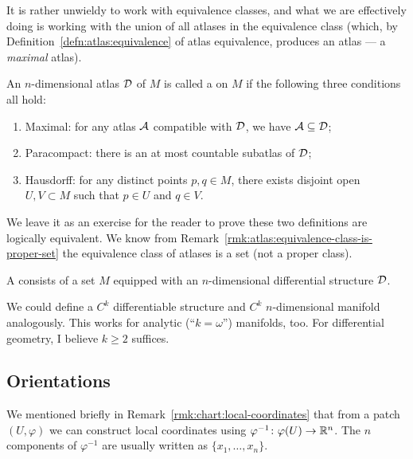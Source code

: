\begin{remark}
It is rather unwieldy to work with equivalence classes, and what we are
effectively doing is working with the union of all atlases in the
equivalence class (which, by Definition~\ref{defn:atlas:equivalence}
of atlas equivalence, produces an atlas --- a \emph{maximal} atlas).
\end{remark}

\begin{definition}
An $n$-dimensional atlas $\mathcal{D}$ of $M$ is called a 
on $M$ if the following three conditions all hold:
\begin{enumerate}
\item Maximal: for any atlas $\mathcal{A}$ compatible with $\mathcal{D}$, we
  have $\mathcal{A}\subseteq\mathcal{D}$;
\item Paracompact: there is an at most countable subatlas of $\mathcal{D}$;
\item Hausdorff: for any distinct points $p,q\in M$, there exists
  disjoint open $U,V\subset M$ such that $p\in U$ and $q\in V$.
\end{enumerate}
\end{definition}

\begin{remark}
We leave it as an exercise for the reader to prove these two definitions
are logically equivalent. We know from Remark~\ref{rmk:atlas:equivalence-class-is-proper-set}
the equivalence class of atlases is a set (not a proper class).
\end{remark}

\begin{definition}
A  consists of
  a set $M$ equipped with an $n$-dimensional differential structure $\mathcal{D}$.
\end{definition}

\begin{remark}
We could define a $C^{k}$ differentiable structure and $C^{k}$
$n$-dimensional manifold analogously. This works for analytic
(``$k=\omega$'') manifolds, too. For differential geometry, I believe
$k\geq2$ suffices.
\end{remark}

\subsection{Orientations}

We mentioned briefly in Remark~\ref{rmk:chart:local-coordinates}
that from a patch $(U,\varphi)$ we can construct local coordinates using
$\varphi^{-1}\colon\varphi(U)\to\mathbb{R}^{n}$.
The $n$ components of $\varphi^{-1}$ are usually written as
$\{x_{1},\dots,x_{n}\}$.

